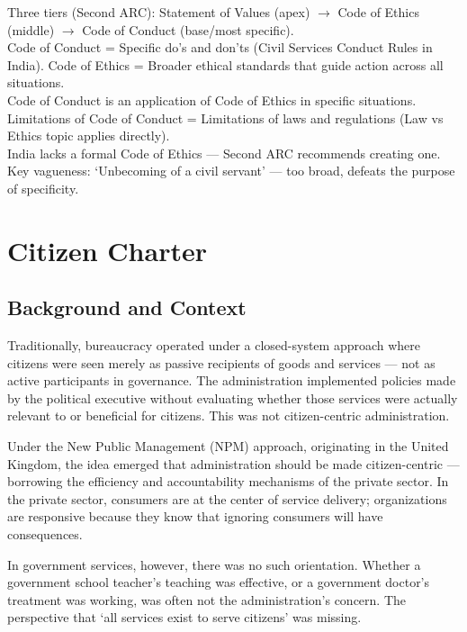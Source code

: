 \begin{QuickRevision}
Three tiers (Second ARC): Statement of Values (apex) $\rightarrow$ Code of Ethics (middle) $\rightarrow$ Code of Conduct (base/most specific).\\
Code of Conduct = Specific do's and don'ts (Civil Services Conduct Rules in India). Code of Ethics = Broader ethical standards that guide action across all situations.\\
Code of Conduct is an application of Code of Ethics in specific situations.\\
Limitations of Code of Conduct = Limitations of laws and regulations (Law vs Ethics topic applies directly).\\
India lacks a formal Code of Ethics --- Second ARC recommends creating one.\\
Key vagueness: `Unbecoming of a civil servant' --- too broad, defeats the purpose of specificity.
\end{QuickRevision}

\section{Citizen Charter}

\subsection{Background and Context}
Traditionally, bureaucracy operated under a closed-system approach where citizens were seen merely as passive recipients of goods and services --- not as active participants in governance. The administration implemented policies made by the political executive without evaluating whether those services were actually relevant to or beneficial for citizens. This was not citizen-centric administration.

Under the New Public Management (NPM) approach, originating in the United Kingdom, the idea emerged that administration should be made citizen-centric --- borrowing the efficiency and accountability mechanisms of the private sector. In the private sector, consumers are at the center of service delivery; organizations are responsive because they know that ignoring consumers will have consequences.

In government services, however, there was no such orientation. Whether a government school teacher's teaching was effective, or a government doctor's treatment was working, was often not the administration's concern. The perspective that `all services exist to serve citizens' was missing.

